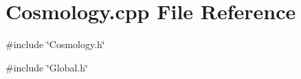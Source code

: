 \section{Cosmology.cpp File Reference}
\label{Cosmology_8cpp}
{\ttfamily \#include \char`\"{}Cosmology.h\char`\"{}}\par
{\ttfamily \#include \char`\"{}Global.h\char`\"{}}\par
